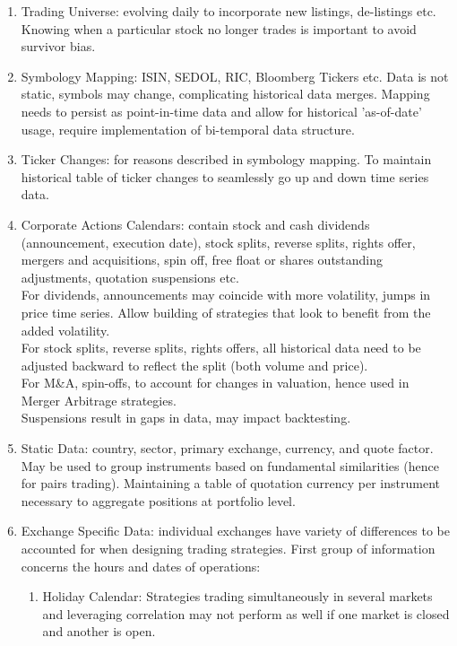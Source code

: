 \begin{definition} 
\begin{enumerate}[label=\roman*.]
\setlength{\itemsep}{0pt}
\item Trading Universe: evolving daily to incorporate new listings, de-listings etc. Knowing when a particular stock no longer trades is important to avoid survivor bias.
\item Symbology Mapping: ISIN, SEDOL, RIC, Bloomberg Tickers etc. Data is not static, symbols may change, complicating historical data merges. Mapping needs to persist as point-in-time data and allow for historical 'as-of-date' usage, require implementation of bi-temporal data structure. 
\item Ticker Changes: for reasons described in symbology mapping. To maintain historical table of ticker changes to seamlessly go up and down time series data.
\item Corporate Actions Calendars: contain stock and cash dividends (announcement, execution date), stock splits, reverse splits, rights offer, mergers and acquisitions, spin off, free float or shares outstanding adjustments, quotation suspensions etc.\\
For dividends, announcements may coincide with more volatility, jumps in price time series. Allow building of strategies that look to benefit from the added volatility.\\
For stock splits, reverse splits, rights offers, all historical data need to be adjusted backward to reflect the split (both volume and price).\\
For M\&A, spin-offs, to account for changes in valuation, hence used in Merger Arbitrage strategies.\\
Suspensions result in gaps in data, may impact backtesting.
\item Static Data: country, sector, primary exchange, currency, and quote factor. May be used to group instruments based on fundamental similarities (hence for pairs trading). Maintaining a table of quotation currency per instrument necessary to aggregate positions at portfolio level.
\item Exchange Specific Data: individual exchanges have variety of differences to be accounted for when designing trading strategies. First group of information concerns the hours and dates of operations:
\begin{enumerate}[label=\arabic*.]
\setlength{\itemsep}{0pt}
\item Holiday Calendar: Strategies trading simultaneously in several markets and leveraging correlation may not perform as well if one market is closed and another is open.

\end{enumerate}
\end{enumerate}
\end{definition}
